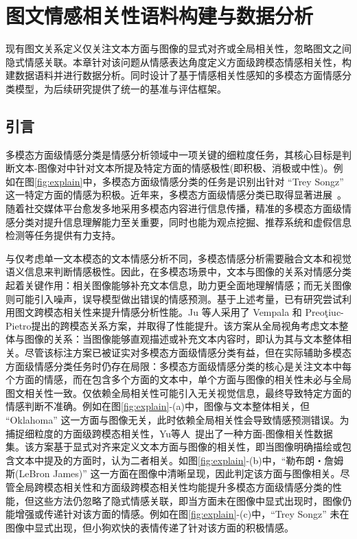 \chapter{图文情感相关性语料构建与数据分析}
现有图文关系定义仅关注文本方面与图像的显式对齐或全局相关性，忽略图文之间隐式情感关联。本章针对该问题从情感表达角度定义方面级跨模态情感相关性，构建数据语料并进行数据分析。同时设计了基于情感相关性感知的多模态方面情感分类模型，为后续研究提供了统一的基准与评估框架。
 

\section{引言}

多模态方面级情感分类是情感分析领域中一项关键的细粒度任务，其核心目标是判断文本-图像对中针对文本所提及特定方面的情感极性(即积极、消极或中性)。例如在图\ref{fig:explain}中，多模态方面级情感分类的任务是识别出针对 “Trey Songz” 这一特定方面的情感为积极。近年来，多模态方面级情感分类已取得显著进展~\cite{ling-etal-2022-vision,zhou2023aomdetectingaspectorientedinformation,peng2024novel}。随着社交媒体平台愈发多地采用多模态内容进行信息传播，精准的多模态方面级情感分类对提升信息理解能力至关重要，同时也能为观点挖掘\cite{huang2025opinion}、推荐系统\cite{zhang2024towards}和虚假信息检测\cite{luvembe2023dual}等任务提供有力支持。

与仅考虑单一文本模态的文本情感分析不同，多模态情感分析需要融合文本和视觉语义信息来判断情感极性。因此，在多模态场景中，文本与图像的关系对情感分类起着关键作用：相关图像能够补充文本信息，助力更全面地理解情感；而无关图像则可能引入噪声，误导模型做出错误的情感预测。基于上述考量，已有研究尝试利用图文跨模态相关性来提升情感分析性能。Ju 等人\cite{ju2021joint}采用了 Vempala 和 Preoţiuc-Pietro\cite{vempala2019categorizing}提出的跨模态关系方案，并取得了性能提升。该方案从全局视角考虑文本整体与图像的关系：当图像能够直观描述或补充文本内容时，即认为其与文本整体相关。尽管该标注方案已被证实对多模态方面级情感分类有益，但在实际辅助多模态方面级情感分类任务时仍存在局限：多模态方面级情感分类的核心是关注文本中每个方面的情感，而在包含多个方面的文本中，单个方面与图像的相关性未必与全局图文相关性一致。仅依赖全局相关性可能引入无关视觉信息，最终导致特定方面的情感判断不准确。例如在图\ref{fig:explain}-(a)中，图像与文本整体相关，但 “Oklahoma” 这一方面与图像无关，此时依赖全局相关性会导致情感预测错误。为捕捉细粒度的方面级跨模态相关性，Yu等人~\cite{yu2022targeted}提出了一种方面-图像相关性数据集。该方案基于显式对齐来定义文本方面与图像的相关性，即当图像明确描绘或包含文本中提及的方面时，认为二者相关。如图\ref{fig:explain}-(b)中，“勒布朗・詹姆斯(LeBron James)” 这一方面在图像中清晰呈现，因此判定该方面与图像相关。尽管全局跨模态相关性和方面级跨模态相关性均能提升多模态方面级情感分类的性能，但这些方法仍忽略了隐式情感关联，即当方面未在图像中显式出现时，图像仍能增强或传递针对该方面的情感。例如在图\ref{fig:explain}-(c)中，“Trey Songz” 未在图像中显式出现，但小狗欢快的表情传递了针对该方面的积极情感。

